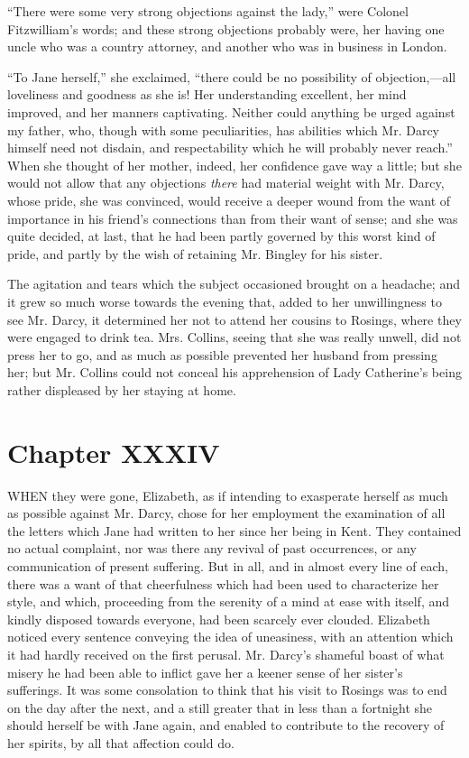\documentclass[12pt,openright]{book}
\begin{document}
“There were some very strong objections against the lady,” were Colonel Fitzwilliam’s words; and these strong objections probably were, her having one uncle who was a country attorney, and another who was in business in London.

“To Jane herself,” she exclaimed, “there could be no possibility of objection,—all loveliness and goodness as she is! Her understanding excellent, her mind improved, and her manners captivating. Neither could anything be urged against my father, who, though with some peculiarities, has abilities which Mr. Darcy himself need not disdain, and respectability which he will probably never reach.” When she thought of her mother, indeed, her confidence gave way a little; but she would not allow that any objections \textit{there} had material weight with Mr. Darcy, whose pride, she was convinced, would receive a deeper wound from the want of importance in his friend’s connections than from their want of sense; and she was quite decided, at last, that he had been partly governed by this worst kind of pride, and partly by the wish of retaining Mr. Bingley for his sister.

The agitation and tears which the subject occasioned brought on a headache; and it grew so much worse towards the evening that, added to her unwillingness to see Mr. Darcy, it determined her not to attend her cousins to Rosings, where they were engaged to drink tea. Mrs. Collins, seeing that she was really unwell, did not press her to go, and as much as possible prevented her husband from pressing her; but Mr. Collins could not conceal his apprehension of Lady Catherine’s being rather displeased by her staying at home.

\chapter{Chapter XXXIV}

\noindent  WHEN they were gone, Elizabeth, as if intending to exasperate herself as much as possible against Mr. Darcy, chose for her employment the examination of all the letters which Jane had written to her since her being in Kent. They contained no actual complaint, nor was there any revival of past occurrences, or any communication of present suffering. But in all, and in almost every line of each, there was a want of that cheerfulness which had been used to characterize her style, and which, proceeding from the serenity of a mind at ease with itself, and kindly disposed towards everyone, had been scarcely ever clouded. Elizabeth noticed every sentence conveying the idea of uneasiness, with an attention which it had hardly received on the first perusal. Mr. Darcy’s shameful boast of what misery he had been able to inflict gave her a keener sense of her sister’s sufferings. It was some consolation to think that his visit to Rosings was to end on the day after the next, and a still greater that in less than a fortnight she should herself be with Jane again, and enabled to contribute to the recovery of her spirits, by all that affection could do.
\end{document}
